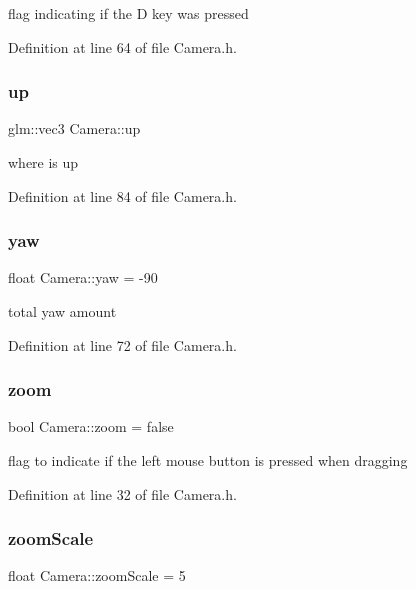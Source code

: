 flag indicating if the D key was pressed 



Definition at line 64 of file Camera.\+h.

\mbox{\label{struct_camera_a3fe5f351380fb118ffc600591769f049}} 
\subsubsection{up}
{\footnotesize\ttfamily glm\+::vec3 Camera\+::up}



where is up 



Definition at line 84 of file Camera.\+h.

\mbox{\label{struct_camera_ad76701b22630f2df28a0ae15f0497a3a}} 
\subsubsection{yaw}
{\footnotesize\ttfamily float Camera\+::yaw = -\/90}



total yaw amount 



Definition at line 72 of file Camera.\+h.

\mbox{\label{struct_camera_a64956b351b5b0173c3d06326ccb43f45}} 
\subsubsection{zoom}
{\footnotesize\ttfamily bool Camera\+::zoom = false}



flag to indicate if the left mouse button is pressed when dragging 



Definition at line 32 of file Camera.\+h.

\mbox{\label{struct_camera_a9523c02d11d2fd610906075d52274691}} 
\subsubsection{zoomScale}
{\footnotesize\ttfamily float Camera\+::zoom\+Scale = 5}



